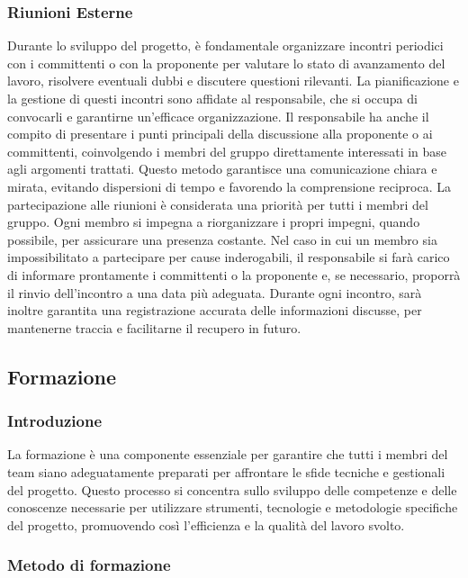 \subsubsection{Riunioni Esterne}
Durante lo sviluppo del progetto, è fondamentale organizzare incontri periodici con i committenti o con la proponente per valutare lo stato di avanzamento del lavoro, risolvere eventuali dubbi e discutere questioni rilevanti. La pianificazione e la gestione di questi incontri sono affidate al responsabile, che si occupa di convocarli e garantirne un’efficace organizzazione.
Il responsabile ha anche il compito di presentare i punti principali della discussione alla proponente o ai committenti, coinvolgendo i membri del gruppo direttamente interessati in base agli argomenti trattati. Questo metodo garantisce una comunicazione chiara e mirata, evitando dispersioni di tempo e favorendo la comprensione reciproca.
La partecipazione alle riunioni è considerata una priorità per tutti i membri del gruppo. Ogni membro si impegna a riorganizzare i propri impegni, quando possibile, per assicurare una presenza costante. Nel caso in cui un membro sia impossibilitato a partecipare per cause inderogabili, il responsabile si farà carico di informare prontamente i committenti o la proponente e, se necessario, proporrà il rinvio dell’incontro a una data più adeguata. Durante ogni incontro, sarà inoltre garantita una registrazione accurata delle informazioni discusse, per mantenerne traccia e facilitarne il recupero in futuro.

\subsection{Formazione}
\subsubsection{Introduzione}
La formazione è una componente essenziale per garantire che tutti i membri del team siano adeguatamente preparati per affrontare le sfide tecniche e gestionali del progetto. Questo processo si concentra sullo sviluppo delle competenze e delle conoscenze necessarie per utilizzare strumenti, tecnologie e metodologie specifiche del progetto, promuovendo così l’efficienza e la qualità del lavoro svolto.

\subsubsection{Metodo di formazione}

